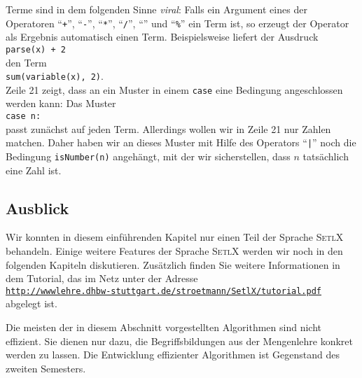 Terme sind in dem folgenden Sinne \emph{viral}:  Falls ein Argument eines der Operatoren
``\texttt{+}'', ``\texttt{-}'', ``\texttt{*}'', ``\texttt{/}'', ``\texttt{}'' und
``\texttt{\%}''
ein Term ist, so erzeugt der Operator als Ergebnis automatisch einen Term.
Beispielsweise liefert der Ausdruck
\\[0.2cm]
\hspace*{1.3cm}
\texttt{parse(x) + 2}
\\[0.2cm]
den Term
\\[0.2cm]
\hspace*{1.3cm}
\texttt{sum(variable(x), 2)}.
\\[0.2cm]
Zeile 21 zeigt, dass an ein Muster in einem \texttt{case} eine Bedingung angeschlossen werden kann:
Das Muster
\\[0.2cm]
\hspace*{1.3cm}
\texttt{case n:}
\\[0.2cm]
passt zun\"{a}chst auf jeden Term.  Allerdings wollen wir in Zeile 21 nur Zahlen matchen.  Daher haben
wir an dieses Muster mit Hilfe des Operators ``\texttt{|}'' noch die Bedingung \texttt{isNumber(n)}
angeh\"{a}ngt, mit der wir sicherstellen, dass $n$ tats\"{a}chlich eine Zahl ist.


\subsection{Ausblick}
Wir konnten in diesem einf\"{u}hrenden Kapitel nur einen Teil der Sprache \textsc{SetlX}
behandeln.  Einige weitere Features
der Sprache \textsc{SetlX} werden wir noch in den folgenden Kapiteln diskutieren.
Zus\"{a}tzlich finden Sie
weitere Informationen  in dem Tutorial, das im Netz unter der Adresse
\\[0.2cm]
\hspace*{1.3cm}
\href{http://wwwlehre.dhbw-stuttgart.de/stroetmann/SetlX/tutorial.pdf}{\texttt{http://wwwlehre.dhbw-stuttgart.de/stroetmann/SetlX/tutorial.pdf}}
\\[0.2cm]
abgelegt ist.  

\remark
Die meisten der in diesem Abschnitt vorgestellten Algorithmen sind 
nicht effizient.  Sie dienen nur dazu, die Begriffsbildungen aus der Mengenlehre konkret
werden zu lassen.  Die Entwicklung effizienter Algorithmen ist Gegenstand des zweiten
Semesters. 



